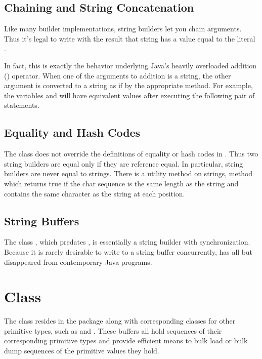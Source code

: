 \subsection{Chaining and String Concatenation}

Like many builder implementations, string builders let you chain
arguments.  Thus it's legal to write
%
%
with the result that string  has a value equal to the
literal .

In fact, this is exactly the behavior underlying Java's heavily
overloaded addition (\code{+}) operator.  When one of the arguments to
addition is a string, the other argument is converted to a string as
if by the appropriate  method.  For example,
the variables  and  will have equivalent values after
executing the following pair of statements.
%



\subsection{Equality and Hash Codes}

The  class does not override the definitions of
equality or hash codes in .  Thus two string builders are
equal only if they are reference equal.  In particular, string
builders are never equal to strings.  There is a utility method on
strings,  method which
returns true if the char sequence is the same length as the string and
contains the same character as the string at each position.

\subsection{String Buffers}

The class , which predates
, is essentially a string builder with
synchronization.  Because it is rarely desirable to write to a
string buffer concurrently,  has all but
disappeared from contemporary Java programs.


\section{ Class}\label{section:char-charbuffer}

The  class resides in the  package
along with corresponding classes for other primitive types, such as
 and .  These buffers all hold sequences
of their corresponding primitive types and provide efficient means to
bulk load or bulk dump sequences of the primitive values they hold.

